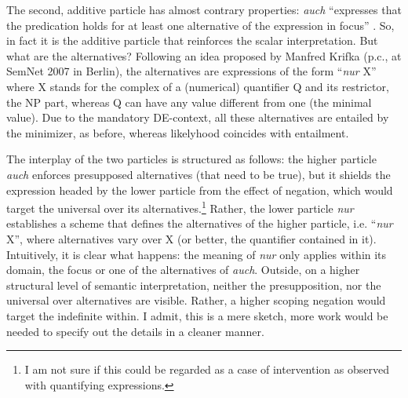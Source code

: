 \documentclass[output=paper,colorlinks,citecolor=brown,
]{langscibook}
\begin{document}
The second, additive particle has almost contrary properties: \textit{auch} ``expresses that the
predication holds for at least one alternative of the expression in focus''
\citep[111]{krifka1998a}. So, in fact it is the additive particle that reinforces the scalar
interpretation. But what are the alternatives? Following an idea proposed by Manfred Krifka (p.c.,
at SemNet 2007 in Berlin), the alternatives are expressions of the form ``\textit{nur} X'' where X
stands for the complex of a (numerical) quantifier Q and its restrictor, the NP part, whereas Q can
have any value different from one (the minimal value). Due to the mandatory DE-context, all these
alternatives are entailed by the minimizer, as before, whereas likelyhood coincides with entailment.

The interplay of the two particles is structured as follows: the higher particle \textit{auch} enforces presupposed
alternatives (that need to be true), but it shields the expression headed by the lower particle from the effect of
negation, which would target the universal over its alternatives.\footnote{I am not sure if this could be regarded as a
case of intervention as observed with quantifying expressions.} Rather, the lower particle \textit{nur}
establishes a scheme that defines the alternatives of the higher particle, i.e. ``\textit{nur} X'', where alternatives
vary over X (or better, the quantifier contained in it). Intuitively, it is clear what happens: the meaning of
\textit{nur} only applies within its domain, the focus or one of the alternatives of \textit{auch}. Outside, on a
higher structural level of semantic interpretation, neither the presupposition, nor the universal over alternatives are
visible. Rather, a higher scoping negation would target the indefinite within. I admit, this is a mere sketch, more
work would be needed to specify out the details in a cleaner manner.
\end{document}
